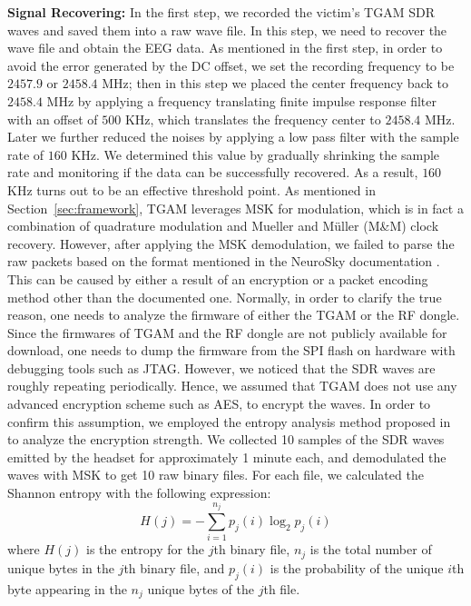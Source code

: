 %
\indent \textbf{Signal Recovering:} In the first step, we recorded the victim's TGAM SDR waves and saved them into a raw wave file. In this step, we need to recover the wave file and obtain the EEG data. As mentioned in the first step, in order to avoid the error generated by the DC offset, we set the recording frequency to be $2457.9$ or $2458.4$ MHz; then in this step we placed the center frequency back to $2458.4$ MHz by applying a frequency translating finite impulse response filter with an offset of $500$ KHz, which translates the frequency center to $2458.4$ MHz. Later we further reduced the noises by applying a low pass filter with the sample rate of $160$ KHz.  We determined this value by gradually shrinking the sample rate and monitoring if the data can be successfully recovered. As a result, $160$ KHz turns out to be an effective threshold point. As mentioned in Section~\ref{sec:framework}, TGAM leverages MSK for modulation, which is in fact a combination of quadrature modulation and Mueller and M\"{u}ller (M\&M) clock recovery. However, after applying the MSK demodulation, we failed to parse the raw packets based on the format mentioned in the NeuroSky documentation \cite{tgsprawpacket}. This can be caused by either a result of an encryption or a packet encoding method other than the documented one. Normally, in order to clarify the true reason, one needs to analyze the firmware of either the TGAM or the RF dongle. Since the firmwares of TGAM and the RF dongle are not publicly available for download, one needs to dump the firmware from the SPI flash on hardware with debugging tools such as JTAG. However, we noticed that the SDR waves are roughly repeating periodically. Hence, we assumed that TGAM does not use any advanced encryption scheme such as AES, to encrypt the waves. In order to confirm this assumption, we employed the entropy analysis method proposed in \cite{lyda2007using} to analyze the encryption strength. We collected 10 samples of the SDR waves emitted by the headset for approximately 1 minute each, and demodulated the waves with MSK to get 10 raw binary files. For each file, we calculated the Shannon entropy with the following expression:
\begin{equation}
H(j)=-\sum_{i=1}^{n_j} p_j(i)\log_{2}p_j(i)
\end{equation}
where $H(j)$ is the entropy for the $j$th binary file, $n_j$ is the total number of unique bytes in the $j$th binary file, and $p_j(i)$ is the probability of the unique $i$th byte appearing in the $n_j$ unique bytes of the $j$th file.\\
